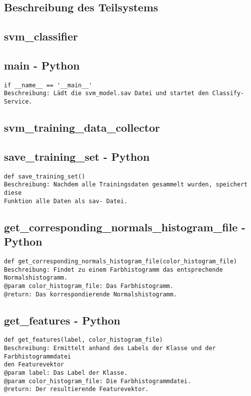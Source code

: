 \documentclass{suturo}
\begin{document}
\subsection{Beschreibung des Teilsystems}
\subsection*{svm\_classifier}
\subsection{main - Python}
\begin{verbatim}
if __name__ == '__main__'
Beschreibung: Lädt die svm_model.sav Datei und startet den Classify- Service.
\end{verbatim}
\subsection*{svm\_training\_data\_collector}

\subsection{save\_training\_set - Python}
\begin{verbatim}
def save_training_set()
Beschreibung: Nachdem alle Trainingsdaten gesammelt wurden, speichert diese 
Funktion alle Daten als sav- Datei.
\end{verbatim}

\subsection{get\_corresponding\_normals\_histogram\_file - Python}
\begin{verbatim}
def get_corresponding_normals_histogram_file(color_histogram_file)
Beschreibung: Findet zu einem Farbhistogramm das entsprechende Normalshistogramm. 
@param color_histogram_file: Das Farbhistogramm.
@return: Das korrespondierende Normalshistogramm.
\end{verbatim}

\subsection{get\_features - Python}
\begin{verbatim}
def get_features(label, color_histogram_file)
Beschreibung: Ermittelt anhand des Labels der Klasse und der Farbhistogrammdatei 
den Featurevektor
@param label: Das Label der Klasse.
@param color_histogram_file: Die Farbhistogrammdatei.
@return: Der resultierende Featurevektor.
\end{verbatim}
\end{document}
